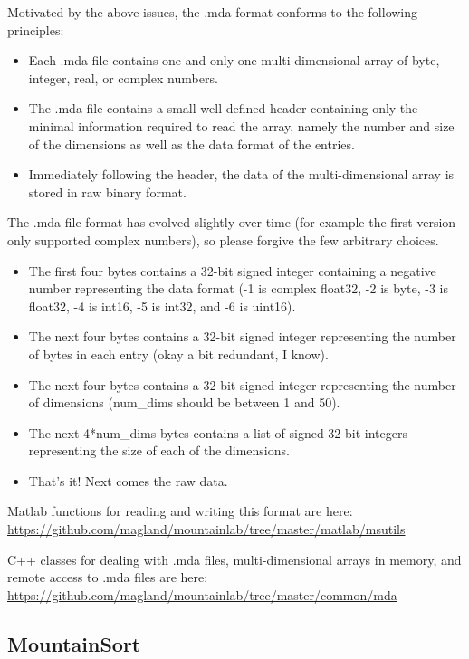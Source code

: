 \documentclass{article}
\begin{document}
Motivated by the above issues, the .mda format conforms to the following principles:
\begin{itemize}
\item{Each .mda file contains one and only one multi-dimensional array of byte, integer, real, or complex numbers.}
\item{The .mda file contains a small well-defined header containing only the minimal information required to read the array, namely the number and size of the dimensions as well as the data format of the entries.}
\item{Immediately following the header, the data of the multi-dimensional array is stored in raw binary format.}
\end{itemize}

The .mda file format has evolved slightly over time (for example the first version only supported complex numbers), so please forgive the few arbitrary choices.

\begin{itemize}
\item{The first four bytes contains a 32-bit signed integer containing a negative number representing the data format (-1 is complex float32, -2 is byte, -3 is float32, -4 is int16, -5 is int32, and -6 is uint16).}
\item{The next four bytes contains a 32-bit signed integer representing the number of bytes in each entry (okay a bit redundant, I know).}
\item{The next four bytes contains a 32-bit signed integer representing the number of dimensions (num\_dims should be between 1 and 50).}
\item{The next 4*num\_dims bytes contains a list of signed 32-bit integers representing the size of each of the dimensions.}
\item{That's it! Next comes the raw data.}
\end{itemize}

Matlab functions for reading and writing this format are here:
\url{https://github.com/magland/mountainlab/tree/master/matlab/msutils}

C++ classes for dealing with .mda files, multi-dimensional arrays in memory, and remote access to .mda files are here: \url{https://github.com/magland/mountainlab/tree/master/common/mda}


\subsection{MountainSort}
\end{document}
